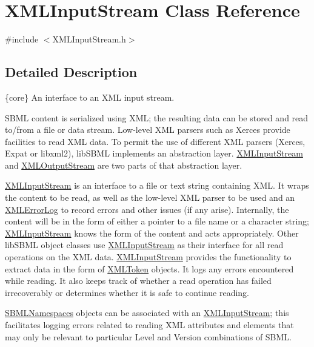 \hypertarget{class_x_m_l_input_stream}{}\section{X\+M\+L\+Input\+Stream Class Reference}
\label{class_x_m_l_input_stream}


{\ttfamily \#include $<$X\+M\+L\+Input\+Stream.\+h$>$}



\subsection{Detailed Description}
\{core\} An interface to an X\+ML input stream.



S\+B\+ML content is serialized using X\+ML; the resulting data can be stored and read to/from a file or data stream. Low-\/level X\+ML parsers such as Xerces provide facilities to read X\+ML data. To permit the use of different X\+ML parsers (Xerces, Expat or libxml2), lib\+S\+B\+ML implements an abstraction layer. \hyperlink{class_x_m_l_input_stream}{X\+M\+L\+Input\+Stream} and \hyperlink{class_x_m_l_output_stream}{X\+M\+L\+Output\+Stream} are two parts of that abstraction layer.

\hyperlink{class_x_m_l_input_stream}{X\+M\+L\+Input\+Stream} is an interface to a file or text string containing X\+ML. It wraps the content to be read, as well as the low-\/level X\+ML parser to be used and an \hyperlink{class_x_m_l_error_log}{X\+M\+L\+Error\+Log} to record errors and other issues (if any arise). Internally, the content will be in the form of either a pointer to a file name or a character string; \hyperlink{class_x_m_l_input_stream}{X\+M\+L\+Input\+Stream} knows the form of the content and acts appropriately. Other lib\+S\+B\+ML object classes use \hyperlink{class_x_m_l_input_stream}{X\+M\+L\+Input\+Stream} as their interface for all read operations on the X\+ML data. \hyperlink{class_x_m_l_input_stream}{X\+M\+L\+Input\+Stream} provides the functionality to extract data in the form of \hyperlink{class_x_m_l_token}{X\+M\+L\+Token} objects. It logs any errors encountered while reading. It also keeps track of whether a read operation has failed irrecoverably or determines whether it is safe to continue reading.

\hyperlink{class_s_b_m_l_namespaces}{S\+B\+M\+L\+Namespaces} objects can be associated with an \hyperlink{class_x_m_l_input_stream}{X\+M\+L\+Input\+Stream}; this facilitates logging errors related to reading X\+ML attributes and elements that may only be relevant to particular Level and Version combinations of S\+B\+ML.

